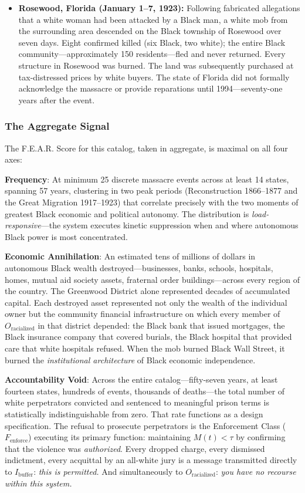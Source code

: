 \begin{itemize}
    \item \textbf{Rosewood, Florida (January 1--7, 1923):} Following fabricated allegations that a white woman had been attacked by a Black man, a white mob from the surrounding area descended on the Black township of Rosewood over seven days. Eight confirmed killed (six Black, two white); the entire Black community---approximately 150 residents---fled and never returned. Every structure in Rosewood was burned. The land was subsequently purchased at tax-distressed prices by white buyers. The state of Florida did not formally acknowledge the massacre or provide reparations until 1994---seventy-one years after the event.

\end{itemize}

\subsubsection{The Aggregate Signal}

The F.E.A.R. Score for this catalog, taken in aggregate, is maximal on all four axes:

\textbf{Frequency}: At minimum 25 discrete massacre events across at least 14 states, spanning 57 years, clustering in two peak periods (Reconstruction 1866--1877 and the Great Migration 1917--1923) that correlate precisely with the two moments of greatest Black economic and political autonomy. The distribution is \textit{load-responsive}---the system executes kinetic suppression when and where autonomous Black power is most concentrated.

\textbf{Economic Annihilation}: An estimated tens of millions of dollars in autonomous Black wealth destroyed---businesses, banks, schools, hospitals, homes, mutual aid society assets, fraternal order buildings---across every region of the country. The Greenwood District alone represented decades of accumulated capital. Each destroyed asset represented not only the wealth of the individual owner but the community financial infrastructure on which every member of $O_{\text{racialized}}$ in that district depended: the Black bank that issued mortgages, the Black insurance company that covered burials, the Black hospital that provided care that white hospitals refused. When the mob burned Black Wall Street, it burned the \textit{institutional architecture} of Black economic independence.

\textbf{Accountability Void}: Across the entire catalog---fifty-seven years, at least fourteen states, hundreds of events, thousands of deaths---the total number of white perpetrators convicted and sentenced to meaningful prison terms is statistically indistinguishable from zero. That rate functions as a design specification. The refusal to prosecute perpetrators is the Enforcement Class ($F_{\text{enforce}}$) executing its primary function: maintaining $M(t) < \tau$ by confirming that the violence was \textit{authorized}. Every dropped charge, every dismissed indictment, every acquittal by an all-white jury is a message transmitted directly to $I_{\text{buffer}}$: \textit{this is permitted.} And simultaneously to $O_{\text{racialized}}$: \textit{you have no recourse within this system.}

